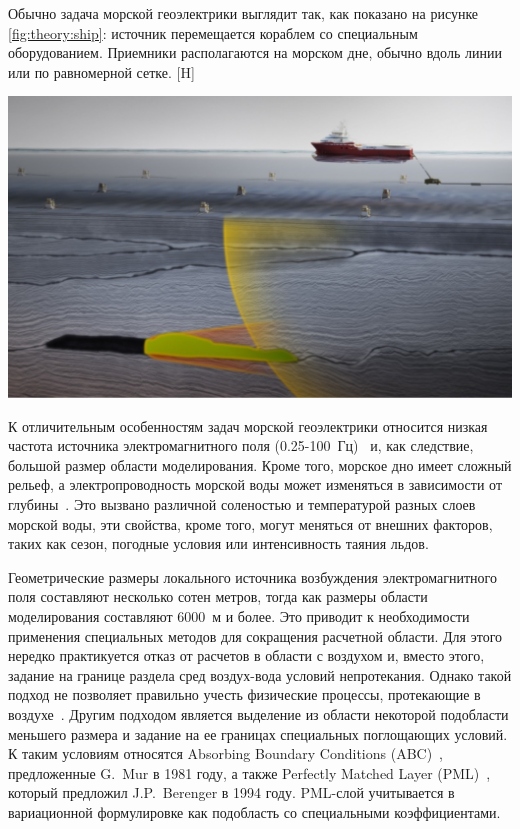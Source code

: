 \documentclass[a4paper,14pt]{article}
\makeatletter
\renewenvironment{figure}[1][\fps@figure]{
  \edef\@tempa{\noexpand\@float{figure}[#1]}
  \@tempa
  \addtocounter{foofigure}{1}
}{
  \end@float
}
\makeatother
\begin{document}
Обычно задача морской геоэлектрики выглядит так, как показано на рисунке \ref{fig:theory:ship}: источник перемещается кораблем со специальным оборудованием. Приемники располагаются на морском дне, обычно вдоль линии или по равномерной сетке.
\begin{figure}[H]
	\centering
	\includegraphics[scale=0.3]{theory/10000000000004B4000002D101BC1A4D.png}
	\caption{задача морской геоэлектрики}
	\label{fig:theory:ship}
\end{figure}


К отличительным особенностям задач морской геоэлектрики относится низкая частота источника электромагнитного поля (0.25-100~Гц)~\citep{gabrielsen} и, как следствие, большой размер области моделирования. Кроме того, морское дно имеет сложный рельеф, а электропроводность морской воды может изменяться в зависимости от глубины~\citep{shurina}. Это вызвано различной соленостью и температурой разных слоев морской воды, эти свойства, кроме того, могут меняться от внешних факторов, таких как сезон, погодные условия или интенсивность таяния льдов.

Геометрические размеры локального источника возбуждения электромагнитного поля составляют несколько сотен метров, тогда как размеры области моделирования составляют 6000~м и более. Это приводит к необходимости применения специальных методов для сокращения расчетной области. Для этого нередко практикуется отказ от расчетов в области с воздухом и, вместо этого, задание на границе раздела сред воздух-вода условий непротекания. Однако такой подход не позволяет правильно учесть физические процессы, протекающие в воздухе~\citep{anderson, conf_nti_2015}. Другим подходом является выделение из области некоторой подобласти меньшего размера и задание на ее границах специальных поглощающих условий. К таким условиям относятся Absorbing Boundary Conditions (ABC)~\citep{mur}, предложенные G.~Mur в 1981 году, а также Perfectly Matched Layer (PML)~\citep{berenger, wiik_dehoop_ursin}, который предложил J.P.~Berenger в 1994 году. PML-слой учитывается в вариационной формулировке как подобласть со специальными коэффициентами.
\end{document}
